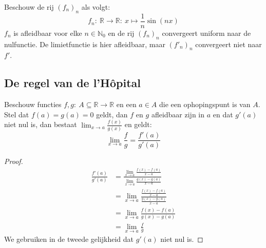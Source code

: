 \documentclass[main.tex]{subfiles}
\begin{document}
\begin{tvb}
  Beschouw de rij $(f_{n})_{n}$ als volgt:
  \[ f_{n}:\ \mathbb{R} \rightarrow \mathbb{R}:\ x \mapsto \frac{1}{n}\sin(nx) \]
  $f_{n}$ is afleidbaar voor elke $n\in \mathbb{N}_{0}$ en de rij $(f_{n})_{n}$ convergeert uniform naar de nulfunctie.
  De limietfunctie is hier afleidbaar, maar $(f'_{n})_{n}$ convergeert niet naar $f'$.
\end{tvb}

\subsection{De regel van de l'H\^opital}
\label{sec:de-regel-van-de-hopital}

\begin{bpr}
  Beschouw functies $f,g:\ A \subseteq \mathbb{R} \rightarrow \mathbb{R}$ en een $a\in A$ die een ophopingspunt is van $A$.
  Stel dat $f(a)=g(a)=0$ geldt, dan $f$ en $g$ afleidbaar zijn in $a$ en dat $g'(a)$ niet nul is, dan bestaat $\lim_{x \rightarrow a}\frac{f(x)}{g(x)}$ en geldt:
  \[ \lim_{x\rightarrow a}\frac{f}{g}= \frac{f'(a)}{g'(a)} \]

  \begin{proof}
    \[
    \begin{array}{rl}
      \frac{f'(a)}{g'(a)}
      &= \frac{\lim_{x\rightarrow a}\frac{f(x)-f(a)}{x-a}}{\lim_{x\rightarrow a}\frac{g(x)-g(a)}{x-a}}\\
      &= \lim_{x\rightarrow a}\frac{\frac{f(x)-f(a)}{x-a}}{\frac{g(x)-g(a)}{x-a}}\\
      &= \lim_{x\rightarrow a}\frac{f(x)-f(a)}{g(x)-g(a)}\\
      &= \lim_{x\rightarrow a}\frac{f}{g}
    \end{array}
    \]
    We gebruiken in de tweede gelijkheid dat $g'(a)$ niet nul is.
  \end{proof}
\end{bpr}
\end{document}
